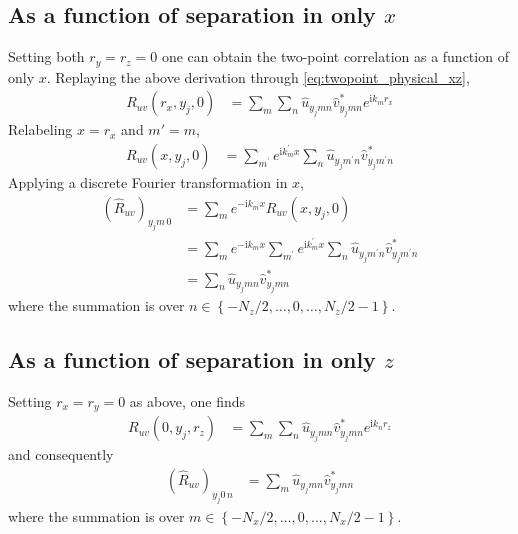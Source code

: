 \documentclass[letterpaper,11pt,nointlimits,reqno]{amsart}
\newcommand{\ii}{\ensuremath{\mathrm{i}}}
\begin{document}
\subsection{As a function of separation in only $x$}

Setting both $r_y = r_z = 0$ one can obtain the two-point correlation as a
function of only $x$.  Replaying the above derivation through
\eqref{eq:twopoint_physical_xz},
\begin{align}
R_{uv} \left( r_x, y_j, 0 \right)
  &=
     \sum_{m}
     \sum_{n}
     \hat{u}_{y_j m n}
     \hat{v}^\ast_{y_j m n}
     e^{\ii k_m r_x}
\end{align}
Relabeling $x = r_x$ and $m'=m$,
\begin{align}
R_{uv} \left( x, y_j, 0 \right)
  &=
     \sum_{m^\prime}
     e^{\ii k_m^\prime x}
     \sum_{n}
     \hat{u}_{y_j m^\prime n}
     \hat{v}^\ast_{y_j m^\prime n}
\end{align}
Applying a discrete Fourier transformation in $x$,
\begin{align}
     \left(\hat{R}_{uv}\right)_{y_j m \, 0}
  &=
     \sum_{m}
     e^{-\ii k_m x}
     R_{uv} \left( x, y_j, 0 \right)
\\
  &=
     \sum_{m}
     e^{-\ii k_m x}
     \sum_{m^\prime}
     e^{\ii k_m^\prime x}
     \sum_{n}
     \hat{u}_{y_j m^\prime n}
     \hat{v}^\ast_{y_j m^\prime n}
\\
  &=
     \sum_{n}
     \hat{u}_{y_j m n}
     \hat{v}^\ast_{y_j m n}
\end{align}
where the summation is over $n \in \left\{-N_z/2, \dots, 0, \dots,
N_z/2-1\right\}$.

\subsection{As a function of separation in only $z$}

Setting $r_x = r_y = 0$ as above, one finds
\begin{align}
R_{uv} \left( 0, y_j, r_z \right)
  &=
     \sum_{m}
     \sum_{n}
     \hat{u}_{y_j m n}
     \hat{v}^\ast_{y_j m n}
     e^{\ii k_n r_z}
\end{align}
and consequently
\begin{align}
     \left(\hat{R}_{uv}\right)_{y_j 0 \, n}
  &=
     \sum_{m}
     \hat{u}_{y_j m n}
     \hat{v}^\ast_{y_j m n}
\end{align}
where the summation is over $m \in \left\{-N_x/2, \dots, 0, \dots,
N_x/2-1\right\}$.
\end{document}
